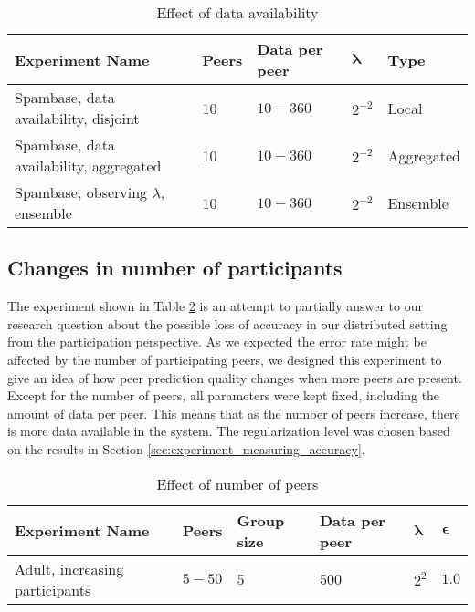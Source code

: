 \begin{table}[h]
	\centering
	\begin{tabular}{|l|l|l|l|l|}
		\textbf{Experiment Name}                                 & \textbf{Peers} & \textbf{Data per peer} & $\boldsymbol{\lambda}$  & \textbf{Type}       \\
		\hline
		Spambase, data availability, disjoint         & 10    & $10-360$  & $2^{-2}$       & Local      \\
		Spambase, data availability, aggregated    & 10    & $10-360$  & $2^{-2}$       & Aggregated \\
		Spambase, observing $\lambda$, ensemble & 10    & $10-360$  & $2^{-2}$   & Ensemble  
	\end{tabular}
	\caption{Effect of data availability}
	\label{tab:experiments_data_availability}
\end{table}

\subsection{Changes in number of participants}

 
The experiment shown in Table \ref{tab:experiments_peer_numbers} is an attempt to partially answer to our research question about the possible loss of accuracy in our distributed setting from the participation perspective. As we expected the error rate might be affected by the number of participating peers, we designed this experiment to give an idea of how peer prediction quality changes when more peers are present. Except for the number of peers, all parameters were kept fixed, including the amount of data per peer. This means that as the number of peers increase, there is more data available in the system. The regularization level was chosen based on the results in Section \ref{sec:experiment_measuring_accuracy}.

\begin{table}[h]
	\centering
	\begin{tabular}{|l|l|l|l|l|l|}
		\textbf{Experiment Name}                & \textbf{Peers}      & \textbf{Group size} & \textbf{Data per peer} & $\boldsymbol{\lambda}$ & $\boldsymbol{\epsilon}$ \\
		\hline
		Adult, increasing participants & $5-50$ & 5          & 500  & $2^{2}$   & $1.0$     
	\end{tabular}
	\caption{Effect of number of peers}
	\label{tab:experiments_peer_numbers}
\end{table}

